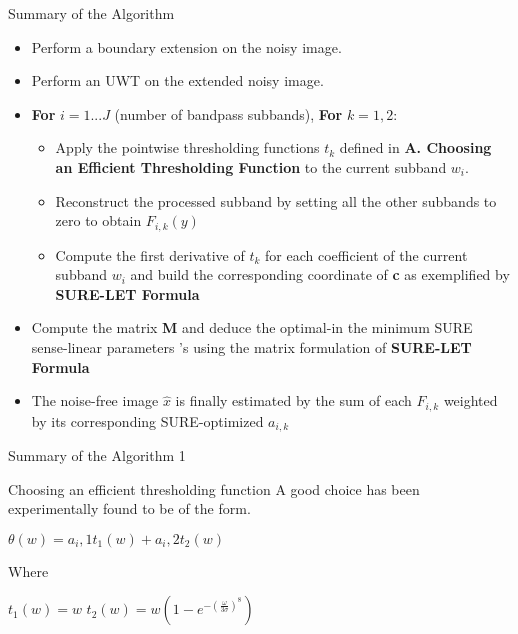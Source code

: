 \documentclass{beamer}
\begin{document}
\begin{frame}{Summary of the Algorithm}
\begin{itemize}
	\item Perform a boundary extension on the noisy image.
	\item Perform an UWT on the extended noisy image.
	\item \textbf{For} $i=1...J$ (number of bandpass subbands), \textbf{For} $k=1,2:$
	\begin{itemize}
		\item Apply the pointwise thresholding functions $t_k$ defined
		in \textbf{A. Choosing an Efficient Thresholding Function} to the current subband $w_i$.
\item Reconstruct the processed subband by setting all the
other subbands to zero to obtain $F_{i,k}(y)$	
\item Compute the first derivative of $t_k$ for each coefficient
of the current subband $w_i$ and build the corresponding
coordinate of \textbf{c} as exemplified by \textbf{SURE-LET Formula}
\end{itemize}
	
	\item Compute the matrix \textbf{M} and deduce the optimal-in the
	minimum SURE sense-linear parameters ’s using the
	matrix formulation of \textbf{SURE-LET Formula}
	\item  The noise-free image $\hat{x}$ is finally estimated by the sum of
	each $F_{i,k}$ weighted by its corresponding SURE-optimized $a_{i,k}$
\end{itemize}
\end{frame}
\begin{frame}{Summary of the Algorithm 1}
\begin{block}{Choosing an efficient thresholding function}
A good choice has been experimentally found to be of the form.
\begin{center}
	$\theta(w)=a_i,1{t_1}(w)+a_i,2{t_2}(w)$
	
\end{center}
\end{block}

\begin{block}{Where}
	\begin{center}
	
		$t_1(w)=w$ $t_2(w)=w\left(1-e^{-(\frac{\omega}{3\sigma})^8} \right)$
	\end{center}
\end{block}
	
\end{frame}
	
\end{document}
